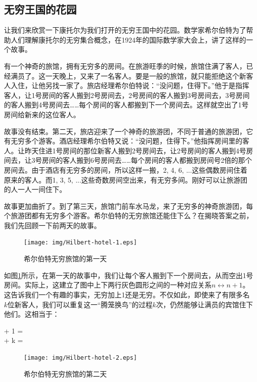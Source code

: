\documentclass{article}
\begin{document}
\subsection{无穷王国的花园}

让我们来欣赏一下康托尔为我们打开的无穷王国中的花园。数学家希尔伯特为了帮助人们理解康托尔的无穷集合概念，在1924年的国际数学家大会上，讲了这样的一个故事。

有一个神奇的旅馆，拥有无穷多的房间。在旅游旺季的时候，旅馆住满了客人，已经满员了。这一天晚上，又来了一名客人。要是一般的旅馆，就只能拒绝这个新客人入住，让他另找一家了。旅店经理希尔伯特说：“没问题，住得下。”他于是指挥客人，让1号房间的客人搬到2号房间去，2号房间的客人搬到3号房间去，3号房间的客人搬到4号房间去……每个房间的客人都搬到下一个房间去。这样就空出了1号房间给新来的这位客人。

故事没有结束。第二天，旅店迎来了一个神奇的旅游团，不同于普通的旅游团，它有无穷多个游客。酒店经理希尔伯特又说：“没问题，住得下。”他指挥房间里的客人。让昨天住进1号房间的那位新客人搬到2号房间去，让2号房间的客人搬到4号房间去，让3号房间的客人搬到6号房间去……每个房间的客人都搬到房间号2倍的那个房间去。由于酒店有无穷多的房间，所以这样一搬，2, 4, 6, ...这些偶数房间住着原来的客人。而1, 3, 5, ...这些奇数房间空出来，有无穷多间。刚好可以让旅游团的人一人一间住下。

故事更加曲折了。到了第三天，旅馆门前车水马龙，来了无穷多的神奇旅游团，每个旅游团都有无穷多个游客。希尔伯特的无穷旅馆还能住下么？在揭晓答案之前，我们先回顾一下前两天的故事。

\begin{figure}[htbp]
 \centering
 \texttt{[image: img/Hilbert-hotel-1.eps]}
 \caption{希尔伯特无穷旅馆的第一天}
 \label{fig:Hilbert-hotel-1}
\end{figure}

如图\ref{fig:Hilbert-hotel-1}所示，在第一天的故事中，我们让每个客人搬到下一个房间去，从而空出1号房间。实际上，这建立了图中上下两行灰色圆形之间的一种对应关系$n \leftrightarrow n+1$。这告诉我们一个有趣的事实，无穷加上1还是无穷。不仅如此，即使来了有限多名$k$位新客人，我们可以重复这一“腾笼换鸟”的过程$k$次，仍然能够让满员的宾馆住下他们。这相当于：

\bean
\infty + 1 = \infty \\
\infty + k = \infty \\
\eean

\begin{figure}[htbp]
 \centering
 \texttt{[image: img/Hilbert-hotel-2.eps]}
 \caption{希尔伯特无穷旅馆的第二天}
 \label{fig:Hilbert-hotel-2}
\end{figure}
\end{document}
